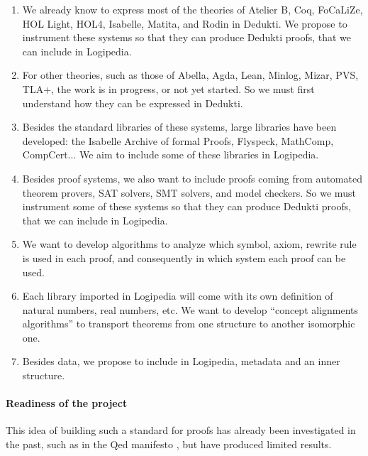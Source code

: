 \begin{enumerate}
\item We already know to express most of the theories of {\sc Atelier B},
{\sc Coq}, {\sc FoCaLiZe}, {\sc HOL Light}, {\sc HOL4}, {\sc
Isabelle}, {\sc Matita}, and {\sc Rodin} in {\sc Dedukti}. We propose
to instrument these systems so that they can produce {\sc Dedukti}
proofs, that we can include in {\sc Logipedia}.

\item
For other theories, such as those of {\sc Abella}, {\sc Agda}, {\sc
Lean}, {\sc Minlog}, {\sc Mizar}, {\sc PVS}, {\sc TLA+}, the work is
in progress, or not yet started.  So we must first understand how they
can be expressed in {\sc Dedukti}.

\item
Besides the standard libraries of these systems, large libraries
have been developed: the Isabelle Archive of formal Proofs,
Flyspeck, MathComp, CompCert...  We aim to include some of
these libraries in {\sc Logipedia}.
  
\item
Besides proof systems, we also want to include proofs coming from
automated theorem provers, SAT solvers, SMT solvers, and model
checkers.  So we must instrument some of these systems so that they
can produce {\sc Dedukti} proofs, that we can include in {\sc
Logipedia}.

\item
We want to develop algorithms to analyze which symbol, axiom, rewrite
rule is used in each proof, and consequently in which system each proof
can be used.

\item
Each library imported in {\sc Logipedia} will come with its own
definition of natural numbers, real numbers, etc. We want to develop
``concept alignments algorithms'' to transport theorems from one
structure to another isomorphic one.

\item 
Besides data, we propose to include in {\sc Logipedia}, metadata and
an inner structure.
\end{enumerate}


\paragraph{Readiness of the project}

This idea of building such a standard for proofs has already been
investigated in the past, such as in the Qed manifesto \cite{Qed94}, but
have produced limited results.

